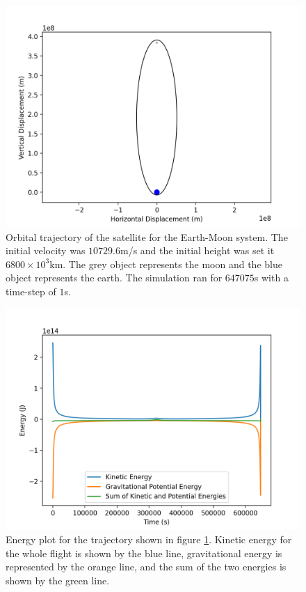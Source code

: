 \documentclass[twocolumn, prl, nobalancelastpage, aps, citeautoscript, longbibliography, 10pt]{revtex4-1}
\begin{document}
\begin{figure}[p!]
    \includegraphics[width = 0.96\linewidth]{Earth-MoonOrbit.png}
    \caption{Orbital trajectory of the satellite for the Earth-Moon system. The initial velocity was $10729.6$m/s and the initial height was set it $6800\times10^3$km. The grey object represents
    the moon and the blue object represents the earth. The simulation ran for $647075$s with a time-step of $1$s.}
    \label{SlingshotOrbit}
\end{figure}
\begin{figure}[p!]
    \includegraphics[width = 0.96\linewidth]{Earth-MoonEnergy.png}
    \caption{Energy plot for the trajectory shown in figure \ref{SlingshotOrbit}. Kinetic energy for the whole flight is shown by the blue line, gravitational energy 
    is represented by the orange line, and the sum of the two energies is shown by the green line. }
    \label{SlingshotEnergy}
\end{figure}
\end{document}
